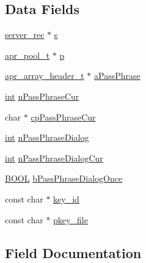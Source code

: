 \subsection*{Data Fields}
\begin{DoxyCompactItemize}
\item 
\hyperlink{structserver__rec}{server\+\_\+rec} $\ast$ \hyperlink{structpphrase__cb__arg__t_a04abf5118944ca1717e080e3360337c7}{s}
\item 
\hyperlink{structapr__pool__t}{apr\+\_\+pool\+\_\+t} $\ast$ \hyperlink{structpphrase__cb__arg__t_a11be93487d30291c9efced2b8ded9101}{p}
\item 
\hyperlink{structapr__array__header__t}{apr\+\_\+array\+\_\+header\+\_\+t} $\ast$ \hyperlink{structpphrase__cb__arg__t_ae08f1163b038c528152af8a490f09f27}{a\+Pass\+Phrase}
\item 
\hyperlink{pcre_8txt_a42dfa4ff673c82d8efe7144098fbc198}{int} \hyperlink{structpphrase__cb__arg__t_aef3e0a2bfde0f62c1bca633c5e388524}{n\+Pass\+Phrase\+Cur}
\item 
char $\ast$ \hyperlink{structpphrase__cb__arg__t_af6aaf85042706fa2215ce1164a2aa7eb}{cp\+Pass\+Phrase\+Cur}
\item 
\hyperlink{pcre_8txt_a42dfa4ff673c82d8efe7144098fbc198}{int} \hyperlink{structpphrase__cb__arg__t_ad85f1529894f1b8f7d271584bb2eb84e}{n\+Pass\+Phrase\+Dialog}
\item 
\hyperlink{pcre_8txt_a42dfa4ff673c82d8efe7144098fbc198}{int} \hyperlink{structpphrase__cb__arg__t_a451eb1ab16d0c471defcb513d5dc5bef}{n\+Pass\+Phrase\+Dialog\+Cur}
\item 
\hyperlink{pcre__internal_8h_a050c65e107f0c828f856a231f4b4e788}{B\+O\+OL} \hyperlink{structpphrase__cb__arg__t_acbcb9e2843857d612329eb5c24b76856}{b\+Pass\+Phrase\+Dialog\+Once}
\item 
const char $\ast$ \hyperlink{structpphrase__cb__arg__t_abb8613c809af29aa0f3ea675efc544f0}{key\+\_\+id}
\item 
const char $\ast$ \hyperlink{structpphrase__cb__arg__t_afc01b5b93a45bd50c5aa697680921d65}{pkey\+\_\+file}
\end{DoxyCompactItemize}


\subsection{Field Documentation}
